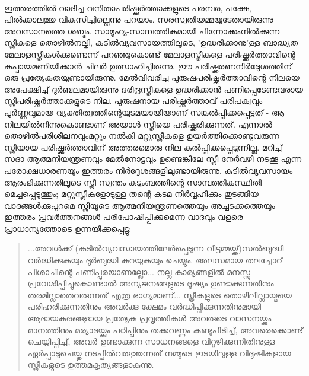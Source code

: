 \paragraph{}ഇത്തരത്തിൽ വാദിച്ച വനിതാപരിഷ്ക്കർത്താക്കളുടെ പരമ്പര, പക്ഷേ, പിൽക്കാലത്തു വികസിച്ചില്ലെന്നു പറയാം. സരസ്വതിയമ്മയുടേതായിരുന്നു അവസാനത്തെ ശബ്ദം. സാമൂഹ്യ-സാമ്പത്തികമായി പിന്നോക്കംനിൽക്കുന്ന സ്ത്രീകളെ തൊഴിൽനല്കി, കുടിൽവ്യവസായത്തിലൂടെ, 'ഉദ്ധരിക്കാനു'ള്ള ബാദ്ധ്യത മേലാളസ്ത്രീകൾക്കുണ്ടെന്ന് പറഞ്ഞുകൊണ്ട് മേലാളസ്ത്രീകളെ പരിഷ്ക്കർത്താവിന്റെ കുപ്പായമണിയിക്കാൻ ചിലർ ഉത്സാഹിച്ചിരുന്നു. ഈ പരിഷ്ക്കരണനിർദ്ദേശത്തിന് ഒരു പ്രത്യേകതയുണ്ടായിരുന്നു. മേൽവിവരിച്ച പുരുഷപരിഷ്ക്കർത്താവിന്റെ നിലയെ അപേക്ഷിച്ച് ദുർബലമായിരുന്നു ദരിദ്രസ്ത്രീകളെ ഉദ്ധരിക്കാൻ പണിപ്പെടേണ്ടവരായ സ്ത്രീപരിഷ്ക്കർത്താക്കളുടെ നില. പുരുഷനായ പരിഷ്ക്കർത്താവ് പരിപക്വവും പൂർണ്ണവുമായ വ്യക്തിത്വത്തിന്റെയുടമയായിയാണ് സങ്കൽപ്പിക്കപ്പെട്ടത് - ആ നിലയിൽനിന്നുകൊണ്ടാണ് അയാൾ സ്ത്രീയെ പരിഷ്ക്കരിക്കുന്നത്. എന്നാൽ തൊഴിൽപരിശീലനവുംമറ്റും നൽകി മറ്റുസ്ത്രീകളെ ഉയർത്തിക്കൊണ്ടുവരുന്ന സ്ത്രീയായ പരിഷ്ക്കർത്താവിന് അത്തരമൊരു നില കൽപ്പിക്കപ്പെടുന്നില്ല. മറിച്ച് സദാ ആത്മനിയന്ത്രണവും മേൽനോട്ടവും ഉണ്ടെങ്കിലേ സ്ത്രീ നേർവഴി നടക്കൂ എന്ന പരോക്ഷധാരണയും ഇത്തരം നിർദ്ദേശങ്ങളിലുണ്ടായിരുന്നു. കുടിൽവ്യവസായം ആരംഭിക്കുന്നതിലൂടെ സ്ത്രീ സ്വന്തം കുടുംബത്തിന്റെ സാമ്പത്തികസ്ഥിതി മെച്ചപ്പെടുത്തും; മറ്റുസ്ത്രീകളോടുള്ള തന്റെ കടമ നിർവ്വഹിക്കും തുടങ്ങിയ വാദങ്ങൾക്കുപുറമെ സ്ത്രീയുടെ ആത്മനിയന്ത്രണത്തെയും അച്ചടക്കത്തെയും ഇത്തരം പ്രവർത്തനങ്ങൾ പരിപോഷിപ്പിക്കുമെന്ന വാദവും വളരെ പ്രാധാന്യത്തോടെ ഉന്നയിക്കപ്പെട്ടു:

\begin{quotation}
...അവൾക്ക് (കുടിൽവ്യവസായത്തിലേർപ്പെടുന്ന വീട്ടമ്മയ്ക്ക്)സൽബുദ്ധി വർദ്ധിക്കുകയും ദുർബുദ്ധി കുറയുകയും ചെയ്യും. അലസമായ തലച്ചോറ് പിശാചിന്റെ പണിപ്പുരയാണല്ലോ... നല്ല കാര്യങ്ങളിൽ മനസ്സു പ്രവേശിപ്പിച്ചുകൊണ്ടാൽ അന്യജനങ്ങളുടെ ദൂഷ്യം ഉണ്ടാക്കുന്നതിനും തരമില്ലാതെവരുന്നത് എത്ര ഭാഗ്യമാണ്... സ്ത്രീകളുടെ തൊഴിലില്ലായ്മയെ പരിഹരിക്കുന്നതിനും അവർക്കു ക്ഷേമം വർദ്ധിപ്പിക്കുന്നതിനുമായി ആദായകരങ്ങളായ പ്രത്യേക പ്രവൃത്തികൾ അവരുടെ വാസനയ്ക്കും മാനത്തിനും മര്യാദയ്ക്കും പഠിപ്പിനും തക്കവണ്ണം കണ്ടുപിടിച്ച്, അവരെക്കൊണ്ട് ചെയ്യിപ്പിച്ച്, അവർ ഉണ്ടാക്കുന്ന സാധനങ്ങളെ വിറ്റഴിക്കുന്നിതിനുള്ള ഏർപ്പാടുചെയ്തു നടപ്പിൽവരുത്തുന്നത് നമ്മുടെ ഇടയിലുള്ള വിദുഷികളായ സ്ത്രീകളുടെ ഉത്തമകൃത്യങ്ങളാകുന്നു. 

\end{quotation}

